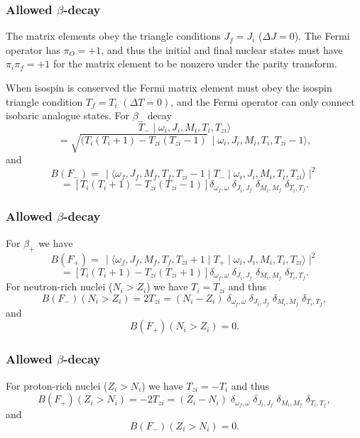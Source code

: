 \documentclass[compress]{beamer}
\begin{document}
\frame
{
\frametitle{Allowed $\beta$-decay}
\begin{small}
{\scriptsize
The matrix elements obey the triangle
conditions $  J_{f}=J_{i}  $ ($  \Delta J=0  $). The Fermi operator has
$  \pi _{O}=+1  $, and thus the
initial and final nuclear states must have $  \pi _{i}\pi _{f}=+1  $ for
the matrix element to be
nonzero under the parity transform.

When isospin is conserved
the Fermi matrix element must obey the isospin triangle condition
$  T_{f}=T_{i}  $ $  (\Delta T=0)  $, and the Fermi operator can only connect
isobaric analogue states. For $\beta_{-}$ decay
\[
T_{-}\mid \omega _{i},J_{i},M_{i},T_{i},T_{zi}\rangle
\]
\[
= \sqrt{(T_{i}(T_{i}+1)-T_{zi}(T_{zi}-1)}\, \mid \omega _{i},J_{i},M_{i},T_{i},T_{zi}-1\rangle,      
\]
and
\[
B(F_{-}) =\, \mid \langle \omega _{f},J_{f},M_{f},T_{f},T_{zi}-1\mid T_{-}\mid \omega 
_{i},J_{i},M_{i},T_{i},T_{zi}\rangle\mid ^{2}
\]
\[
= [T_{i}(T_{i}+1)-T_{zi}(T_{zi}-1)]
\delta _{\omega _{f},\omega }\;\delta _{J_{i},J_{f}}\;\delta _{M_{i},M_{f}}\;\delta _{T_{i},T_{f}}. 
\]

}
\end{small}
}
\frame
{
\frametitle{Allowed $\beta$-decay}
\begin{small}
{\scriptsize
For $\beta_{ + }$ we have
\[
B(F_{+}) =\, \mid \langle \omega _{f},J_{f},M_{f},T_{f},T_{zi}+1\mid T_{+}\mid \omega 
_{i},J_{i},M_{i},T_{i},T_{zi}\rangle\mid ^{2}
\]
\[
= [T_{i}(T_{i}+1)-T_{zi}(T_{zi}+1)]
\delta _{\omega _{f},\omega }\;\delta _{J_{i},J_{f}}\;\delta _{M_{i},M_{f}}\;\delta _{T_{i},T_{f}}. 
\]
For neutron-rich nuclei ($  N_{i}> Z_{i}  $) we have
$  T_{i}=T_{zi}  $ and thus
\[
B(F_{-})(N_{i}> Z_{i}) = 2T_{zi} = (N_{i}-Z_{i}) \;
\delta _{\omega _{f},\omega }\;\delta _{J_{i},J_{f}}\;\delta _{M_{i},M_{f}}\;\delta _{T_{i},T_{f}}, 
\]
and
\[
B(F_{+})(N_{i}> Z_{i}) = 0. 
\]
}
\end{small}
}
\frame
{
\frametitle{Allowed $\beta$-decay}
\begin{small}
{\scriptsize
For proton-rich nuclei ($  Z_{i} >  N_{i}  $) we have
$  T_{zi}=-T_{i}  $ and thus
\[
B(F_{+})(Z_{i} > N_{i}) = -2T_{zi} = (Z_{i}-N_{i}) \;
\delta _{\omega _{f},\omega }\;\delta _{J_{i},J_{f}}\;\delta _{M_{i},M_{f}}\;\delta _{T_{i},T_{f}}, 
\]
and
\[
B(F_{-})(Z_{i} >  N_{i}) = 0. 
\]

}
\end{small}
}
\end{document}

